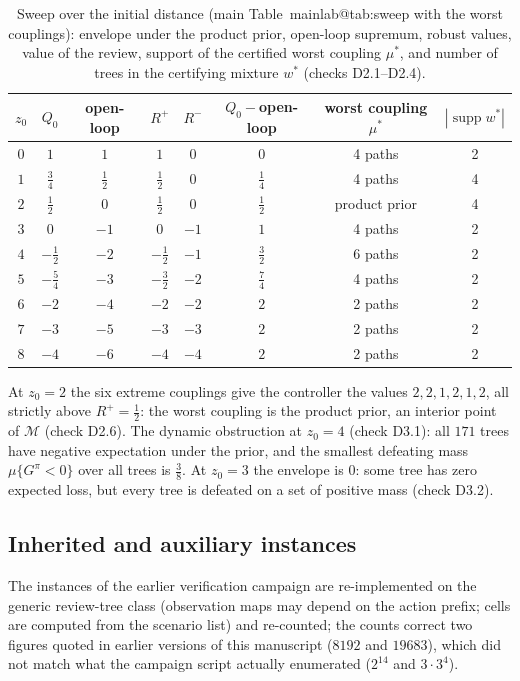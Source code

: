 \documentclass[11pt,a4paper]{article}
\makeatletter
\theoremstyle{plain}
\theoremstyle{definition}
\theoremstyle{remark}
\newcommand{\calM}{\mathcal{M}}
\newcommand{\supp}{\operatorname{supp}}
\newcommand{\tfr}[2]{\tfrac{#1}{#2}}
\newcommand{\mref}[1]{\csname mainlab@#1\endcsname}
\makeatother
\begin{document}
\begin{table}[H]
\centering\small
\caption{Sweep over the initial distance (main Table~\mref{tab:sweep} with the worst couplings): envelope under the product prior, open-loop supremum, robust values, value of the review, support of the certified worst coupling $\mu^\ast$, and number of trees in the certifying mixture $w^\ast$ (checks D2.1--D2.4).}
\begin{tabular}{cccccccc}
\toprule
$z_0$ & $Q_0$ & open-loop & $R^+$ & $R^-$ & $Q_0-$open-loop & worst coupling $\mu^\ast$ & $|\supp w^\ast|$\\
\midrule
$0$ & $1$ & $1$ & $1$ & $0$ & $0$ & 4 paths & 2\\
$1$ & $\tfrac{3}{4}$ & $\tfrac{1}{2}$ & $\tfrac{1}{2}$ & $0$ & $\tfrac{1}{4}$ & 4 paths & 4\\
$2$ & $\tfrac{1}{2}$ & $0$ & $\tfrac{1}{2}$ & $0$ & $\tfrac{1}{2}$ & product prior & 4\\
$3$ & $0$ & $-1$ & $0$ & $-1$ & $1$ & 4 paths & 2\\
$4$ & $-\tfrac{1}{2}$ & $-2$ & $-\tfrac{1}{2}$ & $-1$ & $\tfrac{3}{2}$ & 6 paths & 2\\
$5$ & $-\tfrac{5}{4}$ & $-3$ & $-\tfrac{3}{2}$ & $-2$ & $\tfrac{7}{4}$ & 4 paths & 2\\
$6$ & $-2$ & $-4$ & $-2$ & $-2$ & $2$ & 2 paths & 2\\
$7$ & $-3$ & $-5$ & $-3$ & $-3$ & $2$ & 2 paths & 2\\
$8$ & $-4$ & $-6$ & $-4$ & $-4$ & $2$ & 2 paths & 2\\
\bottomrule
\end{tabular}
\end{table}

At $z_0=2$ the six extreme couplings give the controller the values $2,2,1,2,1,2$, all strictly above $R^+=\tfr12$: the worst coupling is the product prior, an interior point of $\calM$ (check D2.6). The dynamic obstruction at $z_0=4$ (check D3.1): all $171$ trees have negative expectation under the prior, and the smallest defeating mass $\mu\{G^\pi<0\}$ over all trees is $\tfr38$. At $z_0=3$ the envelope is $0$: some tree has zero expected loss, but every tree is defeated on a set of positive mass (check D3.2).

\subsection{Inherited and auxiliary instances}
The instances of the earlier verification campaign are re-implemented on the generic review-tree class (observation maps may depend on the action prefix; cells are computed from the scenario list) and re-counted; the counts correct two figures quoted in earlier versions of this manuscript ($8192$ and $19683$), which did not match what the campaign script actually enumerated ($2^{14}$ and $3\cdot3^4$).
\end{document}
